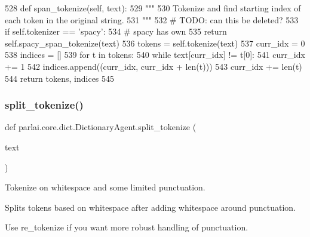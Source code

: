 \begin{DoxyCode}
528     \textcolor{keyword}{def }span\_tokenize(self, text):
529         \textcolor{stringliteral}{"""}
530 \textcolor{stringliteral}{        Tokenize and find  starting index of each token in the original string.}
531 \textcolor{stringliteral}{        """}
532         \textcolor{comment}{# TODO: can this be deleted?}
533         \textcolor{keywordflow}{if} self.tokenizer == \textcolor{stringliteral}{'spacy'}:
534             \textcolor{comment}{# spacy has own}
535             \textcolor{keywordflow}{return} self.spacy\_span\_tokenize(text)
536         tokens = self.tokenize(text)
537         curr\_idx = 0
538         indices = []
539         \textcolor{keywordflow}{for} t \textcolor{keywordflow}{in} tokens:
540             \textcolor{keywordflow}{while} text[curr\_idx] != t[0]:
541                 curr\_idx += 1
542             indices.append((curr\_idx, curr\_idx + len(t)))
543             curr\_idx += len(t)
544         \textcolor{keywordflow}{return} tokens, indices
545 
\end{DoxyCode}
\mbox{\label{classparlai_1_1core_1_1dict_1_1DictionaryAgent_a826ba5c6ff36c8ddf5d7723c50e5616d}} 
\subsubsection{\texorpdfstring{split\+\_\+tokenize()}{split\_tokenize()}}
{\footnotesize\ttfamily def parlai.\+core.\+dict.\+Dictionary\+Agent.\+split\+\_\+tokenize (\begin{DoxyParamCaption}\item[{}]{text }\end{DoxyParamCaption})\hspace{0.3cm}{\ttfamily [static]}}

\begin{DoxyVerb}Tokenize on whitespace and some limited punctuation.

Splits tokens based on whitespace after adding whitespace around
punctuation.

Use re_tokenize if you want more robust handling of punctuation.
\end{DoxyVerb}
 

